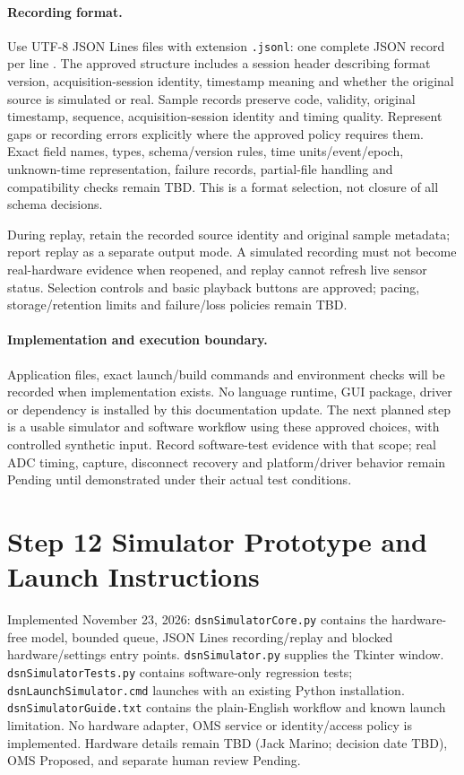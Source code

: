 \paragraph{Recording format.}
Use UTF-8 JSON Lines files with extension \texttt{.jsonl}: one complete JSON
record per line \cite{JSONLinesSpecification}. The approved structure includes
a session header describing format version, acquisition-session identity,
timestamp meaning and whether the original source is simulated or real.
Sample records preserve code, validity, original timestamp, sequence,
acquisition-session identity and timing quality. Represent gaps or recording
errors explicitly where the approved policy requires them. Exact field names,
types, schema/version rules, time units/event/epoch, unknown-time representation,
failure records, partial-file handling and compatibility checks remain TBD.
This is a format selection, not closure of all schema decisions.

During replay, retain the recorded source identity and original sample
metadata; report replay as a separate output mode. A simulated recording must
not become real-hardware evidence when reopened, and replay cannot refresh live
sensor status. Selection controls and basic playback buttons are approved;
pacing, storage/retention limits and failure/loss policies remain TBD.

\paragraph{Implementation and execution boundary.}
Application files, exact launch/build commands and environment checks will be
recorded when implementation exists. No language runtime, GUI package, driver
or dependency is installed by this documentation update. The next planned step
is a usable simulator and software workflow using these approved choices,
with controlled synthetic input. Record software-test evidence with that scope;
real ADC timing, capture, disconnect recovery and platform/driver behavior
remain Pending until demonstrated under their actual test conditions.

\section{Step 12 Simulator Prototype and Launch Instructions}
\label{Section:SimulatorPrototype}
Implemented November 23, 2026: \texttt{dsnSimulatorCore.py} contains the
hardware-free model, bounded queue, JSON Lines recording/replay and blocked
hardware/settings entry points. \texttt{dsnSimulator.py} supplies the Tkinter
window. \texttt{dsnSimulatorTests.py} contains software-only regression tests;
\texttt{dsnLaunchSimulator.cmd} launches with an existing Python installation.
\texttt{dsnSimulatorGuide.txt} contains the plain-English workflow and known
launch limitation. No hardware adapter, OMS service or identity/access policy
is implemented. Hardware details remain TBD (Jack Marino; decision date TBD),
OMS Proposed, and separate human review Pending.

